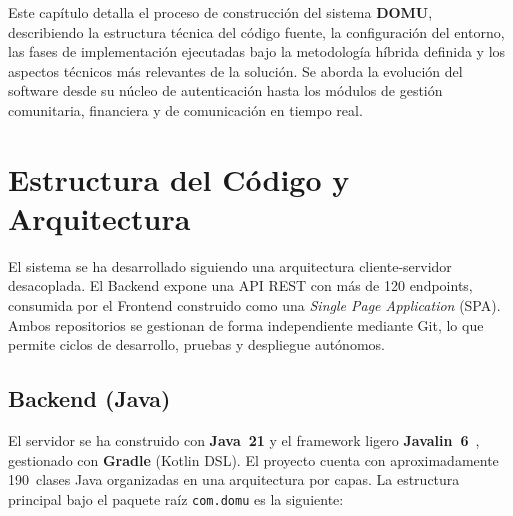 Este capítulo detalla el proceso de construcción del sistema \textbf{DOMU}, describiendo la estructura técnica del código fuente, la configuración del entorno, las fases de implementación ejecutadas bajo la metodología híbrida definida y los aspectos técnicos más relevantes de la solución. Se aborda la evolución del software desde su núcleo de autenticación hasta los módulos de gestión comunitaria, financiera y de comunicación en tiempo real.

\section{Estructura del Código y Arquitectura}
\label{sec:estructura_codigo}

El sistema se ha desarrollado siguiendo una arquitectura cliente-servidor desacoplada. El Backend expone una API REST con más de 120 endpoints, consumida por el Frontend construido como una \textit{Single Page Application} (SPA). Ambos repositorios se gestionan de forma independiente mediante Git, lo que permite ciclos de desarrollo, pruebas y despliegue autónomos.

\subsection{Backend (Java)}
El servidor se ha construido con \textbf{Java~21} y el framework ligero \textbf{Javalin~6}~\cite{javalin2025}, gestionado con \textbf{Gradle} (Kotlin DSL). El proyecto cuenta con aproximadamente 190~clases Java organizadas en una arquitectura por capas. La estructura principal bajo el paquete raíz \texttt{com.domu} es la siguiente:

